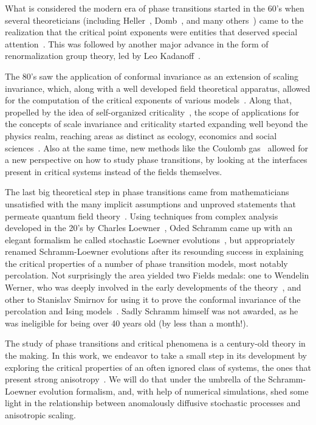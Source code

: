What is considered the modern era of phase transitions started in the 60's when
several theoreticians (including Heller~\cite{Heller1967},
Domb~\cite{Domb1965}, and many others~\cite{Fisher1967}) came to the
realization that the critical point exponents were entities that deserved
special attention~\cite{Stanley1999, Stanley1971}. This was followed by another
major advance in the form of renormalization group theory, led by Leo
Kadanoff~\cite{Kadanoff1966}.

The 80's saw the application of conformal invariance as an extension of scaling
invariance, which, along with a well developed field theoretical apparatus,
allowed for the computation of the critical exponents of various
models~\cite{Belavin1984, Henkel2013}. Along that, propelled by the idea of
self-organized criticality~\cite{Bak1987}, the scope of applications for the
concepts of scale invariance and criticality started expanding well beyond the
physics realm, reaching areas as distinct as ecology, economics and social
sciences~\cite{Bak1996, Christensen2005}. Also at the same time, new methods
like the Coulomb gas~\cite{Nienhuis1984, Minnhagen1987} allowed for a new
perspective on how to study phase transitions, by looking at the interfaces
present in critical systems instead of the fields themselves.

The last big theoretical step in phase transitions came from mathematicians
unsatisfied with the many implicit assumptions and unproved statements that
permeate quantum field theory~\cite{Langlands1994, Cardy2005}. Using techniques
from complex analysis developed in the 20's by Charles
Loewner~\cite{Loewner1923}, Oded Schramm came up with an elegant formalism he
called stochastic Loewner evolutions~\cite{Schramm2000}, but appropriately
renamed Schramm-Loewner evolutions after its resounding success in explaining
the critical properties of a number of phase transition models, most notably
percolation. Not surprisingly the area yielded two Fields medals: one to
Wendelin Werner, who was deeply involved in the early developments of the
theory~\cite{Mackenzie2006}, and other to Stanislav Smirnov for using it to
prove the conformal invariance of the percolation and Ising
models~\cite{Kesten2010}. Sadly Schramm himself was not awarded, as he was
ineligible for being over 40 years old (by less than a month!).

The study of phase transitions and critical phenomena is a century-old theory
in the making. In this work, we endeavor to take a small step in its
development by exploring the critical properties of an often ignored class of
systems, the ones that present strong anisotropy~\cite{Henkel1994}. We will do
that under the umbrella of the Schramm-Loewner evolution formalism, and, with
help of numerical simulations, shed some light in the relationship between
anomalously diffusive stochastic processes and anisotropic scaling.
